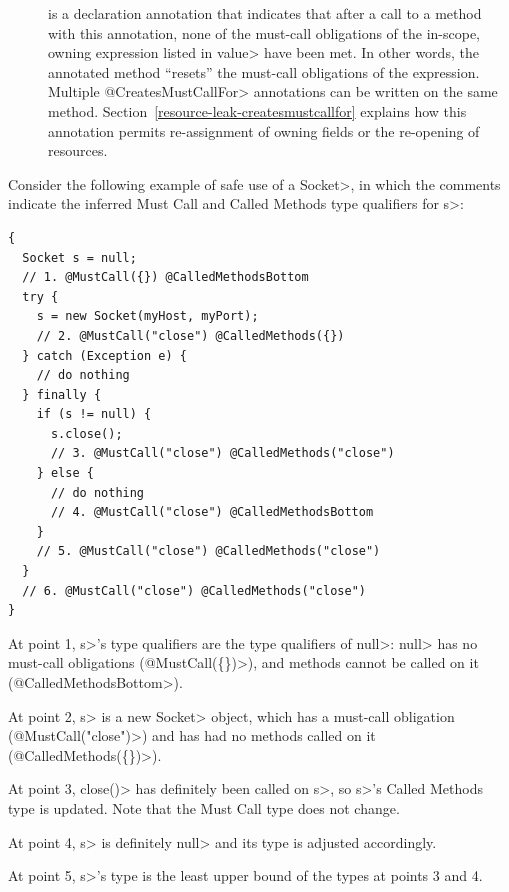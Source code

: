 \begin{description}

\item[]
  is a declaration annotation that indicates that after a call to a method
  with this annotation, none of the must-call obligations of the in-scope, owning expression
  listed in \<value> have been met.
  In other words, the annotated method ``resets'' the must-call obligations of the expression.
  Multiple \<@CreatesMustCallFor>
  annotations can be written on the same method.  Section~\ref{resource-leak-createsmustcallfor}
  explains how this annotation permits re-assignment of owning
  fields or the re-opening of resources.

\end{description}



Consider the following example of safe use of a \<Socket>, in which the comments indicate the
inferred Must Call and Called Methods type qualifiers for \<s>:
\begin{verbatim}
{
  Socket s = null;
  // 1. @MustCall({}) @CalledMethodsBottom
  try {
    s = new Socket(myHost, myPort);
    // 2. @MustCall("close") @CalledMethods({})
  } catch (Exception e) {
    // do nothing
  } finally {
    if (s != null) {
      s.close();
      // 3. @MustCall("close") @CalledMethods("close")
    } else {
      // do nothing
      // 4. @MustCall("close") @CalledMethodsBottom
    }
    // 5. @MustCall("close") @CalledMethods("close")
  }
  // 6. @MustCall("close") @CalledMethods("close")
}
\end{verbatim}

At point 1, \<s>'s type qualifiers are the type qualifiers of \<null>:
\<null> has no must-call obligations (\<@MustCall(\{\})>),
and methods cannot be called on it (\<@CalledMethodsBottom>).

At point 2, \<s> is a new \<Socket> object, which
has a must-call obligation (\<@MustCall("close")>)
and has had no methods called on it (\<@CalledMethods(\{\})>).

At point 3, \<close()> has definitely been called on \<s>, so
\<s>'s Called Methods type is updated. Note that the Must Call type
does not change.

At point 4, \<s> is definitely \<null> and its type is adjusted accordingly.

At point 5, \<s>'s type is the least upper bound of the types at points 3
and 4.

